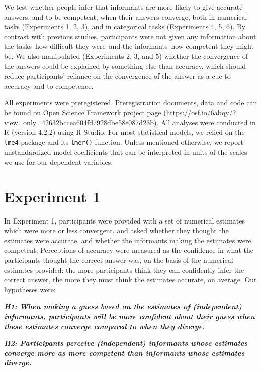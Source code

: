 \documentclass[
  doc,floatsintext]{apa6}
\begin{document}
We test whether people infer that informants are more likely to give accurate answers, and to be competent, when their answers converge, both in numerical tasks (Experiments 1, 2, 3), and in categorical tasks (Experiments 4, 5, 6). By contrast with previous studies, participants were not given any information about the tasks--how difficult they were--and the informants--how competent they might be. We also manipulated (Experiments 2, 3, and 5) whether the convergence of the answers could be explained by something else than accuracy, which should reduce participants' reliance on the convergence of the answer as a cue to accuracy and to competence.

All experiments were preregistered. Preregistration documents, data and code can be found on Open Science Framework \href{https://osf.io/6abqy/?view_only=42632bccea604fd7928dbe58e087d23b}{project page} (\url{https://osf.io/6abqy/?view_only=42632bccea604fd7928dbe58e087d23b}). All analyses were conducted in R (version 4.2.2) using R Studio. For most statistical models, we relied on the \texttt{lme4} package and its \texttt{lmer()} function. Unless mentioned otherwise, we report unstandardized model coefficients that can be interpreted in units of the scales we use for our dependent variables.

\section{Experiment 1}\label{experiment-1}

In Experiment 1, participants were provided with a set of numerical estimates which were more or less convergent, and asked whether they thought the estimates were accurate, and whether the informants making the estimates were competent. Perceptions of accuracy were measured as the confidence in what the participants thought the correct answer was, on the basis of the numerical estimates provided: the more participants think they can confidently infer the correct answer, the more they must think the estimates accurate, on average. Our hypotheses were:

\textbf{\emph{H1: When making a guess based on the estimates of (independent) informants, participants will be more confident about their guess when these estimates converge compared to when they diverge.}}

\textbf{\emph{H2: Participants perceive (independent) informants whose estimates converge more as more competent than informants whose estimates diverge.}}
\end{document}
